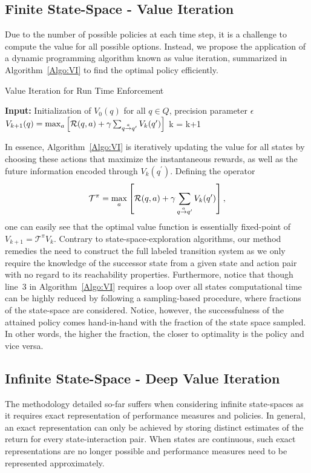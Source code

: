 \subsection{Finite State-Space - Value Iteration}
Due to the number of possible policies at each time step, it is a challenge to compute the value for all possible options. Instead, we propose the application of a dynamic programming algorithm known as value iteration, summarized in Algorithm~\ref{Algo:VI} to find the optimal policy efficiently. 
\begin{algorithm}[h!]
\caption{Value Iteration for Run Time Enforcement}
\label{Algo:VI}
\begin{algorithmic}[1]
\STATE \textbf{Input:} Initialization of $V_{0}(q)$ for all $q\in Q$, precision parameter $\epsilon$
			\STATE $V_{k+1}(q) = \max_{a} \left[\mathcal{R}(q, a) + \gamma \sum_{q \goesto[a]q^{\prime}}V_{k}(q^{\prime})\right]$
		\ENDFOR
	\ENDFOR
		\STATE k = k+1
\ENDWHILE
\end{algorithmic}
\end{algorithm}

In essence, Algorithm~\ref{Algo:VI} is iteratively updating the value for all states by choosing these actions that maximize the instantaneous rewards, as well as the future information encoded through $V_{k}(q^{\prime})$. Defining the operator $$\mathcal{T}^{\pi} = \max_{a} \left[\mathcal{R}(q, a) + \gamma \sum_{q \goesto[a]q^{\prime}}V_{k}(q^{\prime})\right],$$ one can easily see that the optimal value function is essentially  fixed-point of $V_{k+1} = \mathcal{T}^{\pi}  V_{k}$. Contrary to state-space-exploration algorithms, our method remedies the need to construct the full labeled transition system as we only require the knowledge of the successor state from a given state and action pair with no regard to its reachability properties. Furthermore, notice that though line~3 in Algorithm~\ref{Algo:VI} requires a loop over all states computational time can be highly reduced by following a sampling-based procedure, where fractions of the state-space are considered. Notice, however, the successfulness of the attained policy comes hand-in-hand with the fraction of the state space sampled. In other words, the higher the fraction, the closer to optimality is the policy and vice versa. 




\subsection{Infinite State-Space - Deep Value Iteration}
The methodology detailed so-far suffers when considering infinite state-spaces as it requires exact representation of performance measures and policies. In general, an exact representation can only be achieved by storing distinct estimates of the return for every state-interaction pair. When states are continuous, such exact representations are no longer possible and performance measures need to be represented approximately. 

